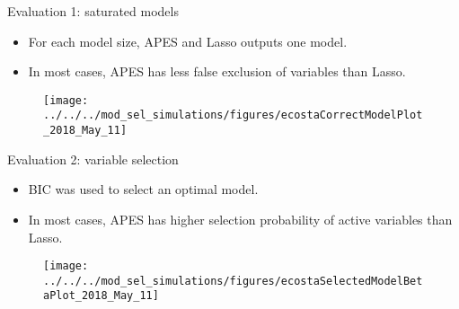 \documentclass[12pt,aspectratio=169]{beamer}
\begin{document}
%
%
%
%
%
%




\begin{frame}{Evaluation 1: saturated models}

\begin{itemize}
	\item For each model size, APES and Lasso outputs one model. 
	\item In most cases, APES has less false exclusion of variables than Lasso. 
\end{itemize}

\begin{figure}
	\centering
	\texttt{[image: ../../../mod\_sel\_simulations/figures/ecostaCorrectModelPlot\_2018\_May\_11]}
\end{figure}


\end{frame}



\begin{frame}{Evaluation 2: variable selection}

\begin{itemize}
	\item BIC was used to select an optimal model. 
	\item In most cases, APES has higher selection probability of active variables than Lasso. 
\end{itemize}

\begin{figure}
	\centering
	\texttt{[image: ../../../mod\_sel\_simulations/figures/ecostaSelectedModelBetaPlot\_2018\_May\_11]}
\end{figure}
\end{frame}
\end{document}
